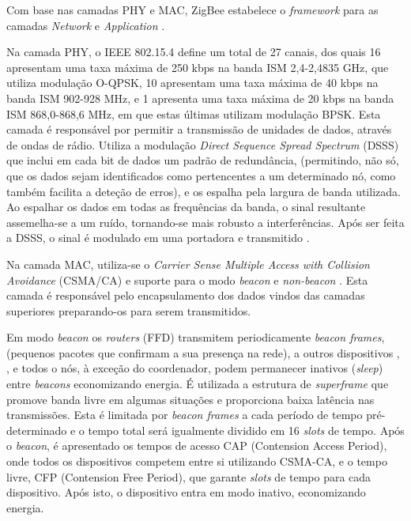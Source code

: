 \documentclass[conference]{IEEEtran}
\begin{document}
Com base nas camadas PHY e MAC, ZigBee estabelece o \textit{framework} para as camadas \textit{Network} e \textit{Application} \cite{liang2006impact}.

Na camada PHY, o IEEE 802.15.4 define um total de 27 canais, dos quais 16 apresentam uma taxa máxima de 250 kbps na banda ISM 2,4-2,4835 GHz, que utiliza modulação O-QPSK, 10 apresentam uma taxa máxima de 40 kbps na banda ISM 902-928 MHz, e 1 apresenta uma taxa máxima de 20 kbps na banda ISM 868,0-868,6 MHz, em que estas últimas utilizam modulação BPSK.
Esta camada é responsável por permitir a transmissão de unidades de dados, através de ondas de rádio.
Utiliza a modulação \textit{Direct Sequence Spread Spectrum} (DSSS) que inclui em cada bit de dados um padrão de redundância, (permitindo, não só, que os dados sejam identificados como pertencentes a um determinado nó, como também facilita a deteção de erros), e os espalha pela largura de banda utilizada.
Ao espalhar os dados em todas as frequências da banda, o sinal resultante assemelha-se a um ruído, tornando-se mais robusto a interferências. 
Após ser feita a DSSS, o sinal é modulado em uma portadora e transmitido \cite{liang2006impact}.

Na camada MAC, utiliza-se o \textit{Carrier Sense Multiple Access with Collision Avoidance} (CSMA/CA) e suporte para o modo \textit{beacon} e \textit{non-beacon} \cite{liang2006impact}.
Esta camada é responsável pelo encapsulamento dos dados vindos das camadas superiores preparando-os para serem transmitidos.

Em modo \textit{beacon} os \textit{routers} (FFD) transmitem periodicamente \textit{beacon frames}, (pequenos pacotes que confirmam a sua presença na rede), a outros dispositivos \cite{cirilo2014computaccao}, \cite{liang2006impact}, e todos o nós, à exceção do coordenador, podem permanecer inativos (\textit{sleep}) entre \textit{beacons} economizando energia.
É utilizada a estrutura de \textit{superframe} que promove banda livre em algumas situações e proporciona baixa latência nas transmissões.
Esta é limitada por \textit{beacon frames} a cada período de tempo pré-determinado e o tempo total será igualmente dividido em 16 \textit{slots} de tempo.
Após o \textit{beacon}, é apresentado os tempos de acesso CAP (Contension Access Period), onde todos os dispositivos competem entre si utilizando CSMA-CA, e o tempo livre, CFP (Contension Free Period), que garante \textit{slots} de tempo para cada dispositivo. 
Após isto, o dispositivo entra em modo inativo, economizando energia.
\end{document}

